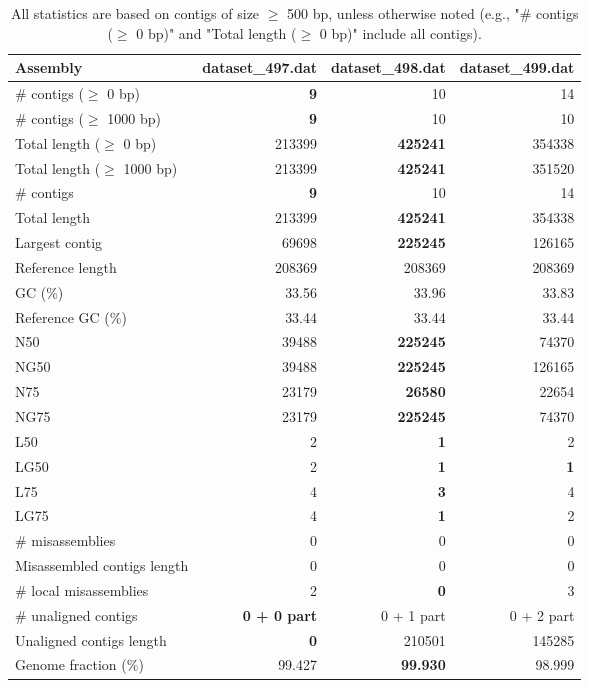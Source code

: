 \documentclass[12pt,a4paper]{article}
\begin{document}
\begin{table}[ht]
\begin{center}
\caption{All statistics are based on contigs of size $\geq$ 500 bp, unless otherwise noted (e.g., "\# contigs ($\geq$ 0 bp)" and "Total length ($\geq$ 0 bp)" include all contigs).}
\begin{tabular}{|l*{3}{|r}|}
\hline
Assembly & dataset\_497.dat & dataset\_498.dat & dataset\_499.dat \\ \hline
\# contigs ($\geq$ 0 bp) & {\bf 9} & 10 & 14 \\ \hline
\# contigs ($\geq$ 1000 bp) & {\bf 9} & 10 & 10 \\ \hline
Total length ($\geq$ 0 bp) & 213399 & {\bf 425241} & 354338 \\ \hline
Total length ($\geq$ 1000 bp) & 213399 & {\bf 425241} & 351520 \\ \hline
\# contigs & {\bf 9} & 10 & 14 \\ \hline
Total length & 213399 & {\bf 425241} & 354338 \\ \hline
Largest contig & 69698 & {\bf 225245} & 126165 \\ \hline
Reference length & 208369 & 208369 & 208369 \\ \hline
GC (\%) & 33.56 & 33.96 & 33.83 \\ \hline
Reference GC (\%) & 33.44 & 33.44 & 33.44 \\ \hline
N50 & 39488 & {\bf 225245} & 74370 \\ \hline
NG50 & 39488 & {\bf 225245} & 126165 \\ \hline
N75 & 23179 & {\bf 26580} & 22654 \\ \hline
NG75 & 23179 & {\bf 225245} & 74370 \\ \hline
L50 & 2 & {\bf 1} & 2 \\ \hline
LG50 & 2 & {\bf 1} & {\bf 1} \\ \hline
L75 & 4 & {\bf 3} & 4 \\ \hline
LG75 & 4 & {\bf 1} & 2 \\ \hline
\# misassemblies & 0 & 0 & 0 \\ \hline
Misassembled contigs length & 0 & 0 & 0 \\ \hline
\# local misassemblies & 2 & {\bf 0} & 3 \\ \hline
\# unaligned contigs & {\bf 0 + 0 part} & 0 + 1 part & 0 + 2 part \\ \hline
Unaligned contigs length & {\bf 0} & 210501 & 145285 \\ \hline
Genome fraction (\%) & 99.427 & {\bf 99.930} & 98.999 \\ \hline

\end{tabular}
\end{center}
\end{table}
\end{document}
